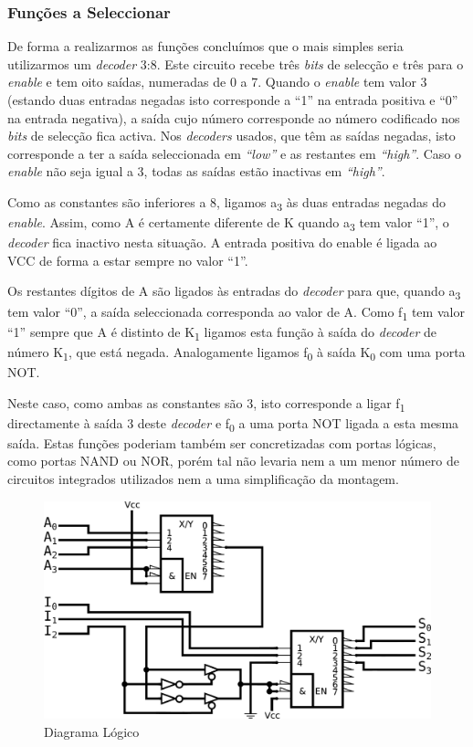 \documentclass[a4paper,12pt]{article}
\begin{document}
\subsubsection{Funções a Seleccionar}
De forma a realizarmos as funções concluímos que o mais simples seria utilizarmos um {\it decoder} 3:8. Este circuito recebe três {\it bits} de selecção e três para o {\it enable} e tem oito saídas, numeradas de 0 a 7. Quando o {\it enable} tem valor 3 (estando duas entradas negadas isto corresponde a ``1'' na entrada positiva e ``0'' na entrada negativa), a saída cujo número corresponde ao número codificado nos {\it bits} de selecção fica activa. Nos {\it decoders} usados, que têm as saídas negadas, isto corresponde a ter a saída seleccionada em {\it ``low''} e as restantes em {\it ``high''}. Caso o {\it enable} não seja igual a 3, todas as saídas estão inactivas em  {\it ``high''}.
\par
Como as constantes são inferiores a 8, ligamos a\textsubscript{3} às duas entradas negadas do {\it enable}. Assim, como A é certamente diferente de K quando a\textsubscript{3} tem valor ``1'', o {\it decoder} fica inactivo nesta situação. A entrada positiva do enable é ligada ao VCC de forma a estar sempre no valor ``1''. 
\par
Os restantes dígitos de A são ligados às entradas do {\it decoder} para que, quando a\textsubscript{3} tem valor ``0'', a saída seleccionada corresponda ao valor de A. Como f\textsubscript{1} tem valor ``1''  sempre que A é distinto de K\textsubscript{1} ligamos esta função à saída do {\it decoder} de número K\textsubscript{1}, que está negada. Analogamente ligamos f\textsubscript{0} à saída K\textsubscript{0} com uma porta NOT.
\par
Neste caso, como ambas as constantes são 3, isto corresponde a ligar 
f\textsubscript{1} directamente à saída 3 deste {\it decoder} e 
f\textsubscript{0} a uma porta NOT ligada a esta mesma saída. Estas funções 
poderiam também ser concretizadas com portas lógicas, como portas NAND ou 
NOR, porém tal não levaria nem a um menor número de circuitos integrados 
utilizados nem a uma simplificação da montagem.
\par

\begin{figure}
\centering
\includegraphics[scale=.1]{logigrama.eps}
\caption{Diagrama Lógico}
\end{figure}
\par
\par
\end{document}
